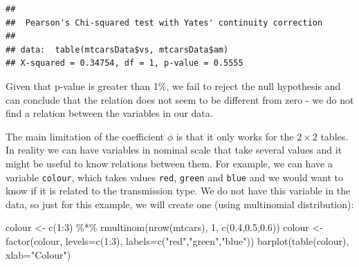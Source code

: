 \documentclass[
]{book}
\newenvironment{Shaded}{\begin{snugshade}}{\end{snugshade}}
\newcommand{\AttributeTok}[1]{\textcolor[rgb]{0.77,0.63,0.00}{#1}}
\newcommand{\DecValTok}[1]{\textcolor[rgb]{0.00,0.00,0.81}{#1}}
\newcommand{\FloatTok}[1]{\textcolor[rgb]{0.00,0.00,0.81}{#1}}
\newcommand{\FunctionTok}[1]{\textcolor[rgb]{0.00,0.00,0.00}{#1}}
\newcommand{\NormalTok}[1]{#1}
\newcommand{\OtherTok}[1]{\textcolor[rgb]{0.56,0.35,0.01}{#1}}
\newcommand{\SpecialCharTok}[1]{\textcolor[rgb]{0.00,0.00,0.00}{#1}}
\newcommand{\StringTok}[1]{\textcolor[rgb]{0.31,0.60,0.02}{#1}}
\theoremstyle{definition}
\theoremstyle{definition}
\theoremstyle{definition}
\theoremstyle{definition}
\theoremstyle{remark}
\begin{document}
\begin{Shaded}
\end{Shaded}

\begin{verbatim}
## 
##  Pearson's Chi-squared test with Yates' continuity correction
## 
## data:  table(mtcarsData$vs, mtcarsData$am)
## X-squared = 0.34754, df = 1, p-value = 0.5555
\end{verbatim}

Given that p-value is greater than 1\%, we fail to reject the null hypothesis and can conclude that the relation does not seem to be different from zero - we do not find a relation between the variables in our data.

The main limitation of the coefficient \(\phi\) is that it only works for the \(2\times 2\) tables. In reality we can have variables in nominal scale that take several values and it might be useful to know relations between them. For example, we can have a variable \texttt{colour}, which takes values \texttt{red}, \texttt{green} and \texttt{blue} and we would want to know if it is related to the transmission type. We do not have this variable in the data, so just for this example, we will create one (using multinomial distribution):

\begin{Shaded}
\begin{Highlighting}[]
\NormalTok{colour }\OtherTok{\textless{}{-}} \FunctionTok{c}\NormalTok{(}\DecValTok{1}\SpecialCharTok{:}\DecValTok{3}\NormalTok{) }\SpecialCharTok{\%*\%} \FunctionTok{rmultinom}\NormalTok{(}\FunctionTok{nrow}\NormalTok{(mtcars), }\DecValTok{1}\NormalTok{,}
                               \FunctionTok{c}\NormalTok{(}\FloatTok{0.4}\NormalTok{,}\FloatTok{0.5}\NormalTok{,}\FloatTok{0.6}\NormalTok{))}
\NormalTok{colour }\OtherTok{\textless{}{-}} \FunctionTok{factor}\NormalTok{(colour, }\AttributeTok{levels=}\FunctionTok{c}\NormalTok{(}\DecValTok{1}\SpecialCharTok{:}\DecValTok{3}\NormalTok{),}
                 \AttributeTok{labels=}\FunctionTok{c}\NormalTok{(}\StringTok{"red"}\NormalTok{,}\StringTok{"green"}\NormalTok{,}\StringTok{"blue"}\NormalTok{))}
\FunctionTok{barplot}\NormalTok{(}\FunctionTok{table}\NormalTok{(colour), }\AttributeTok{xlab=}\StringTok{"Colour"}\NormalTok{)}
\end{Highlighting}
\end{Shaded}
\end{document}
